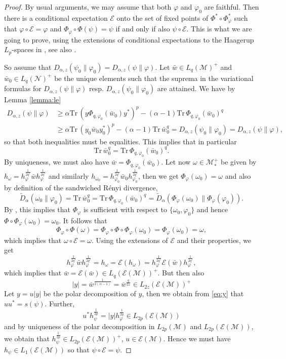 \documentclass[12pt]{article}
\theoremstyle{definition}
\theoremstyle{remark}
\def\Me{\mathcal M}
\def\Ee{\mathcal E}
\def\Ne{\mathcal N}
\def \Tr{\mathrm{Tr}\,}
\begin{document}
\begin{proof} By usual arguments, we may assume that both $\varphi$ and $\varphi_0$ are
faithful. Then there is a  conditional expectation $\Ee$ onto the set of fixed points of
$\Phi^*\circ\Phi_\varphi^*$ such that $\varphi\circ \Ee=\varphi$ and  
$\Phi_\varphi\circ\Phi(\psi)=\psi$ if and only if also $\psi\circ \Ee$. This is what we
are going to prove, using the extensions of conditional expectations to the Haagerup
$L_p$-spaces in \cite{junge2003noncommutative}, see also \cite[Sec. 1]{AJnote3}. 

So assume that $D_{\alpha,z}(\psi_0\|\varphi_0)=D_{\alpha,z}(\psi\|\varphi)$. Let $\bar
w\in L_q(\Me)^+$ and $\bar w_0\in L_q(\Ne)^+$ be the unique elements such that the suprema
in the variational formulas for $D_{\alpha,z}(\psi\|\varphi)$ resp.
$D_{\alpha,z}(\psi_0\|\varphi_0)$ are attained. We have by Lemma \ref{lemma:le}
\begin{align*}
D_{\alpha,z}(\psi\|\varphi)&\ge \alpha\Tr(y\Phi_{q,\varphi_0}(\bar w_0)y^*)^p-(\alpha-1)\Tr
\Phi_{q,\varphi_0}(\bar w_0)^q\\
&\ge \alpha\Tr(y_0\bar w_0 y_0^*)^p-(\alpha-1)\Tr \bar
w_0^q=D_{\alpha,z}(\psi_0\|\varphi_0)=D_{\alpha,z}(\psi\|\varphi),
\end{align*}
so that both inequalities must be equalities. This implies that in particular
\[
\Tr \bar w_0^q=\Tr \Phi_{q,\varphi_0}(\bar w_0)^q.
\]
By uniqueness, we must also have  $\bar w=\Phi_{q,\varphi_0}(\bar w_0)$. Let now $\omega\in \Me_*^+$ be given by
$h_{\omega}=h_\varphi^{\frac1{2q'}}\bar wh_\varphi^{\frac1{2q'}}$ and similarly
$h_{\omega_0}=h_{\varphi_0}^{\frac1{2q'}}\bar w_0h_{\varphi_0}^{\frac1{2q'}}$, then 
we get  $\Phi_\varphi(\omega_0)=\omega$ and also by
definition of the sandwiched R\'enyi divergence,
\[
\tilde D_\alpha(\omega_0\|\varphi_0)=\Tr \bar w_0^q=\Tr \Phi_{q,\varphi_0}(\bar
w_0)^q=\tilde D_\alpha(\Phi_\varphi(\omega_0)\|\Phi_\varphi(\varphi_0)).
\]
By \cite{jencova2018renyi}, this implies that $\Phi_\varphi$ is sufficient with respect to
$\{\omega_0,\varphi_0\}$ and hence $\Phi\circ\Phi_\varphi(\omega_0)=\omega_0$. It follows
that
\[
\Phi_\varphi\circ\Phi(\omega)=\Phi_\varphi\circ \Phi\circ
\Phi_\varphi(\omega_0)=\Phi_\varphi(\omega_0)=\omega,
\]
which implies that $\omega\circ \Ee=\omega$. Using the extensions of $\Ee$ and their
properties, we get
\[
h_\varphi^{\frac1{2q'}}\bar
wh_\varphi^{\frac1{2q'}}=h_\omega=\Ee(h_\omega)=h_\varphi^{\frac1{2q'}}\Ee(\bar
w)h_\varphi^{\frac1{2q'}},
\]
which implies that $\bar w=\Ee(\bar w)\in L_q(\Ee(\Me))^+$. But then also 
\[
|y|=\bar w^{\frac1{2(\alpha-1)}}=\bar w^{\frac{q}{2z}}\in L_{2z}(\Ee(\Me))^+
\]
Let $y=u|y|$ be the polar decomposition of $y$, then we obtain from \eqref{eq:y} that
$uu^*=s(\psi)$. Further,
\[
u^*h_\psi^{\frac1{2p}}=|y|h_\varphi^{\frac1{2q}}\in L_{2p}(\Ee(\Me))
\]
and by uniqueness of the polar decomposition in $L_{2p}(\Me)$ and $L_{2p}(\Ee(\Me))$, we
obtain that $h_{\psi}^{\frac1{2p}}\in L_{2p}(\Ee(\Me))^+$, $u\in \Ee(\Me)$. Hence we must
have $h_\psi\in L_1(\Ee(\Me))$ so that $\psi\circ\Ee=\psi$.


\end{proof}
\end{document}
